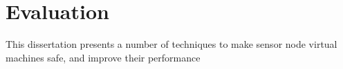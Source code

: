 \chapter{Evaluation}
\label{sec-evaluation}

This dissertation presents a number of techniques to make sensor node virtual machines safe, and improve their performance
